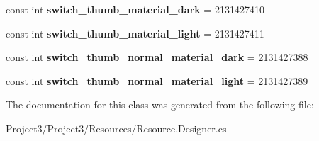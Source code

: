 \begin{DoxyCompactItemize}
\item 
\mbox{\label{classXaria_1_1Resource_1_1Color_a0e75b3d1c41bf1ad49bcdc3035b5a94b}} 
const int {\bfseries switch\+\_\+thumb\+\_\+material\+\_\+dark} = 2131427410
\item 
\mbox{\label{classXaria_1_1Resource_1_1Color_a9d87744ecf4d38789918192647afbaa8}} 
const int {\bfseries switch\+\_\+thumb\+\_\+material\+\_\+light} = 2131427411
\item 
\mbox{\label{classXaria_1_1Resource_1_1Color_a4960730a0d4217bce44669d8fa54581a}} 
const int {\bfseries switch\+\_\+thumb\+\_\+normal\+\_\+material\+\_\+dark} = 2131427388
\item 
\mbox{\label{classXaria_1_1Resource_1_1Color_ad8294de42c369886b3bcc75406589c05}} 
const int {\bfseries switch\+\_\+thumb\+\_\+normal\+\_\+material\+\_\+light} = 2131427389
\end{DoxyCompactItemize}


The documentation for this class was generated from the following file\+:\begin{DoxyCompactItemize}
\item 
Project3/\+Project3/\+Resources/Resource.\+Designer.\+cs\end{DoxyCompactItemize}
